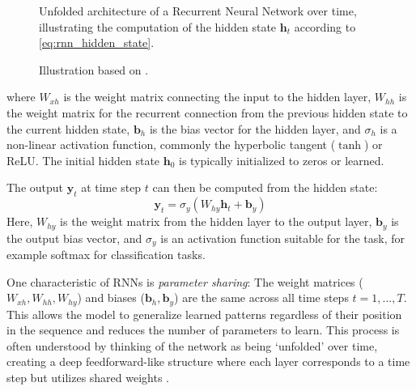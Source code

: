 \begin{figure}[htbp]
    \caption[RNN Unfolded]{Unfolded architecture of a Recurrent Neural Network over time, illustrating the computation of the hidden state \(\bm{h}_t\) according to \autoref{eq:rnn_hidden_state}.}
    \label{fig:rnn_unfolded}
    \caption*{Illustration based on \textcite{geron2022hands}. }
\end{figure}

where \( W_{xh} \) is the weight matrix connecting the input to the hidden layer, \( W_{hh} \) is the weight matrix for the recurrent connection from the previous hidden state to the current hidden state, \( \bm{b}_h \) is the bias vector for the hidden layer, and \( \sigma_h \) is a non-linear activation function, commonly the hyperbolic tangent (\(\tanh\)) or ReLU. The initial hidden state \( \bm{h}_0 \) is typically initialized to zeros or learned.

The output \( \bm{y}_t \) at time step \( t \) can then be computed from the hidden state:
\begin{equation}
    \bm{y}_t = \sigma_y (W_{hy} \bm{h}_t + \bm{b}_y)
    \label{eq:rnn_output}
\end{equation}
Here, \( W_{hy} \) is the weight matrix from the hidden layer to the output layer, \( \bm{b}_y \) is the output bias vector, and \( \sigma_y \) is an activation function suitable for the task, for example softmax for classification tasks.

One characteristic of RNNs is \textit{parameter sharing}: The weight matrices (\( W_{xh}, W_{hh}, W_{hy} \)) and biases (\( \bm{b}_h, \bm{b}_y \)) are the same across all time steps \( t = 1, ..., T \). This allows the model to generalize learned patterns regardless of their position in the sequence and reduces the number of parameters to learn. This process is often understood by thinking of the network as being `unfolded' over time, creating a deep feedforward-like structure where each layer corresponds to a time step but utilizes shared weights \autocite{medsker2001recurrent}.


